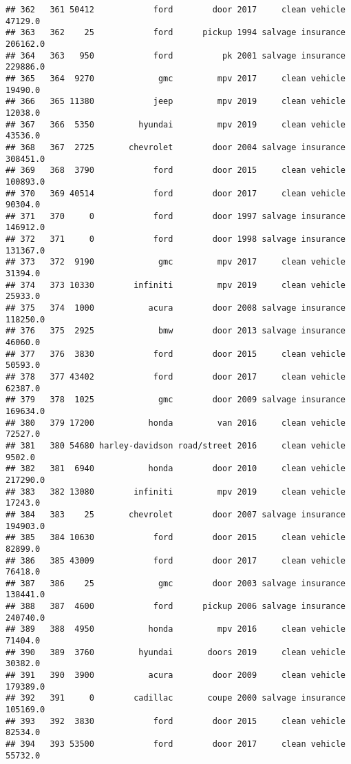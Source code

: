 \documentclass[
]{article}
\begin{document}
\begin{verbatim}
## 362   361 50412            ford        door 2017     clean vehicle   47129.0
## 363   362    25            ford      pickup 1994 salvage insurance  206162.0
## 364   363   950            ford          pk 2001 salvage insurance  229886.0
## 365   364  9270             gmc         mpv 2017     clean vehicle   19490.0
## 366   365 11380            jeep         mpv 2019     clean vehicle   12038.0
## 367   366  5350         hyundai         mpv 2019     clean vehicle   43536.0
## 368   367  2725       chevrolet        door 2004 salvage insurance  308451.0
## 369   368  3790            ford        door 2015     clean vehicle  100893.0
## 370   369 40514            ford        door 2017     clean vehicle   90304.0
## 371   370     0            ford        door 1997 salvage insurance  146912.0
## 372   371     0            ford        door 1998 salvage insurance  131367.0
## 373   372  9190             gmc         mpv 2017     clean vehicle   31394.0
## 374   373 10330        infiniti         mpv 2019     clean vehicle   25933.0
## 375   374  1000           acura        door 2008 salvage insurance  118250.0
## 376   375  2925             bmw        door 2013 salvage insurance   46060.0
## 377   376  3830            ford        door 2015     clean vehicle   50593.0
## 378   377 43402            ford        door 2017     clean vehicle   62387.0
## 379   378  1025             gmc        door 2009 salvage insurance  169634.0
## 380   379 17200           honda         van 2016     clean vehicle   72527.0
## 381   380 54680 harley-davidson road/street 2016     clean vehicle    9502.0
## 382   381  6940           honda        door 2010     clean vehicle  217290.0
## 383   382 13080        infiniti         mpv 2019     clean vehicle   17243.0
## 384   383    25       chevrolet        door 2007 salvage insurance  194903.0
## 385   384 10630            ford        door 2015     clean vehicle   82899.0
## 386   385 43009            ford        door 2017     clean vehicle   76418.0
## 387   386    25             gmc        door 2003 salvage insurance  138441.0
## 388   387  4600            ford      pickup 2006 salvage insurance  240740.0
## 389   388  4950           honda         mpv 2016     clean vehicle   71404.0
## 390   389  3760         hyundai       doors 2019     clean vehicle   30382.0
## 391   390  3900           acura        door 2009     clean vehicle  179389.0
## 392   391     0        cadillac       coupe 2000 salvage insurance  105169.0
## 393   392  3830            ford        door 2015     clean vehicle   82534.0
## 394   393 53500            ford        door 2017     clean vehicle   55732.0

\end{verbatim}
\end{document}
